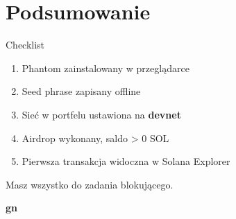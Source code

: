 \section{Podsumowanie}

\begin{frame}{Checklist}
  \begin{enumerate}
    \item[{[\ ]}] Phantom zainstalowany w przeglądarce
    \item[{[\ ]}] Seed phrase zapisany offline
    \item[{[\ ]}] Sieć w portfelu ustawiona na \textbf{devnet}
    \item[{[\ ]}] Airdrop wykonany, saldo \textgreater{} 0 SOL
    \item[{[\ ]}] Pierwsza transakcja widoczna w Solana Explorer
  \end{enumerate}
  \vspace{0.5cm}
  \begin{center}
    \textcolor{stplmuted}{Masz wszystko do zadania blokującego.}
  \end{center}
\end{frame}

\begin{frame}[plain]
  \begin{center}
    \vfill
    {\Huge\bfseries\color{stplwhite} gn}
    \vfill
  \end{center}
\end{frame}


